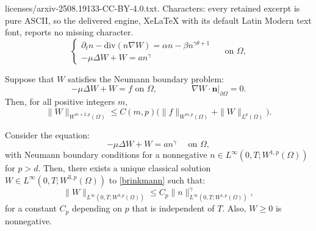 \documentclass[10pt,a4paper]{amsart}
\newcommand{\bd}{\boldsymbol}
\begin{document}
licenses/arxiv-2508.19133-CC-BY-4.0.txt. Characters: every retained excerpt is pure ASCII, so the delivered engine, XeLaTeX with its default Latin Modern text font, reports no missing character.
\begin{equation}\label{equations}
\begin{cases}
    \partial_{t}n - \text{div}(n\nabla W) = \alpha n - \beta n^{\gamma \theta + 1} \\
    -\mu \Delta W + W = an^{\gamma}
\end{cases} \quad \text{ on } \Omega,
\end{equation}

\begin{proposition}\label{CZest}
Suppose that $W$ satisfies the Neumann boundary problem:
\begin{equation*}
-\mu \Delta W + W = f \text{ on } \Omega, \qquad \qquad \nabla W \cdot \bd{n}|_{\partial \Omega} = 0.
\end{equation*}
Then, for all positive integers $m$, 
\begin{equation*}
\|W\|_{W^{m + 2, p}(\Omega)} \le C(m, p) \Big(\|f\|_{W^{m, p}(\Omega)} + \|W\|_{L^{p}(\Omega)}\Big).
\end{equation*}
\end{proposition}

\begin{proposition}\label{nonnegativeW}
    Consider the equation:
    \begin{equation}\label{brinkmann}
        -\mu \Delta W + W = an^{\gamma} \quad \text{ on } \Omega,
    \end{equation}
    with Neumann boundary conditions for a nonnegative $n \in L^{\infty}(0, T; W^{1, p}(\Omega))$ for $p > d$. Then, there exists a unique classical solution $W \in L^{\infty}(0, T; W^{3, p}(\Omega))$ to \eqref{brinkmann} such that:
    \begin{equation*}
        \|W\|_{L^{\infty}(0, T; W^{3, p}(\Omega))} \le C_p\|n\|_{L^{\infty}(0, T; W^{1, p}(\Omega))}^{\gamma},
    \end{equation*}
    for a constant $C_p$ depending on $p$ that is independent of $T$. Also, $W \ge 0$ is nonnegative.
\end{proposition}
\end{document}
